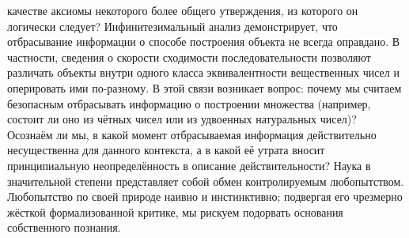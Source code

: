 \documentclass[12pt]{article}
\begin{document}
качестве аксиомы некоторого более общего утверждения, из которого он логически следует? Инфинитезимальный анализ демонстрирует, что отбрасывание информации о способе построения объекта не всегда оправдано. В частности, сведения о скорости сходимости последовательности позволяют различать объекты внутри одного класса эквивалентности вещественных чисел и оперировать ими по-разному. В этой связи возникает вопрос: почему мы считаем безопасным отбрасывать информацию о построении множества (например, состоит ли оно из чётных чисел или из удвоенных натуральных чисел)? Осознаём ли мы, в какой момент отбрасываемая информация действительно несущественна для данного контекста, а в какой её утрата вносит принципиальную неопределённость в описание действительности? Наука в значительной степени представляет собой обмен контролируемым любопытством. Любопытство по своей природе наивно и инстинктивно; подвергая его чрезмерно жёсткой формализованной критике, мы рискуем подорвать основания собственного познания.
\end{document}
